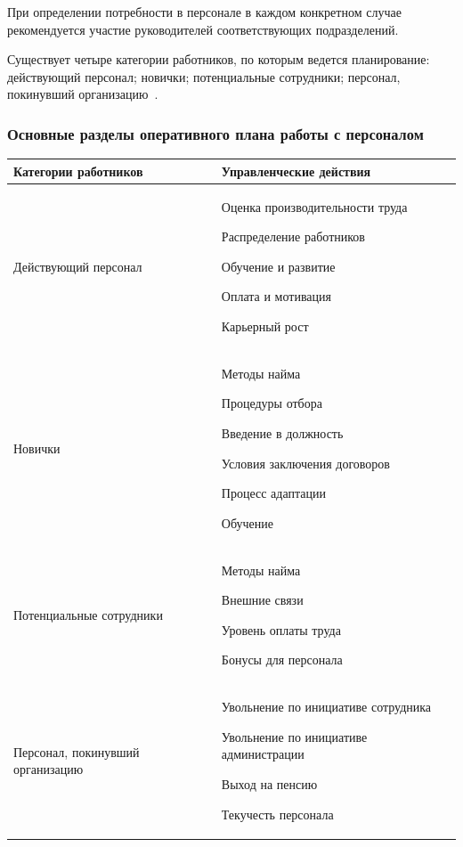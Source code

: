 \documentclass{../industrial-development}
\begin{document}
При определении потребности в персонале в каждом конкретном случае рекомендуется участие руководителей соответствующих подразделений.

Существует четыре категории работников, по которым ведется планирование: действующий персонал; новички; потенциальные сотрудники; персонал, покинувший организацию~\cite[с.~88]{Ivanova}.


\begin{frame} \frametitle{Основные разделы оперативного плана работы с персоналом}

\begin{table}[h]
\begin{center}
\begin{tabular}{|p{4cm}|p{5cm}|}
\hline
\tiny \textbf{Категории работников} & \tiny \textbf{Управленческие действия} \\
\hline
\tiny Действующий персонал & \tiny Оценка производительности труда

Распределение работников

Обучение и развитие

Оплата и мотивация

Карьерный рост
 \\
\hline
\tiny Новички & \tiny Методы найма

Процедуры отбора

Введение в должность

Условия заключения договоров

Процесс адаптации

Обучение \\
\hline
\tiny Потенциальные сотрудники & \tiny Методы найма

Внешние связи

Уровень оплаты труда

Бонусы для персонала \\
\hline
\tiny Персонал, покинувший организацию & \tiny Увольнение по инициативе сотрудника 

Увольнение по инициативе администрации

Выход на пенсию

Текучесть персонала \\
\hline
\end{tabular}
\end{center}
\end{table}

\end{frame}
\end{document}
